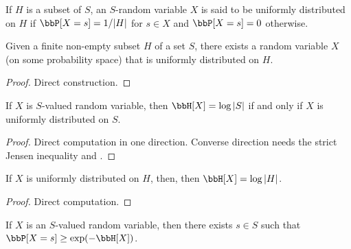 \begin{definition}\label{uniform-def}\leanok
   If $H$ is a subset of $S$, an $S$-random variable $X$ is said to be uniformly distributed on $H$ if $\bbP[X = s] = 1/|H|$ for $s \in X$ and $\bbP[X=s] = 0$ otherwise.
\end{definition}

\begin{lemma}\label{unif-exist}
  \leanok
  Given a finite non-empty subset $H$ of a set $S$, there exists a random variable $X$ (on some probability space) that is uniformly distributed on $H$.
\end{lemma}

\begin{proof}\leanok Direct construction.
\end{proof}


\begin{lemma}\label{uniform-entropy}
  \leanok
  If $X$ is $S$-valued random variable, then $\bbH[X] = \log |S|$ if and only if $X$ is uniformly distributed on $S$.
\end{lemma}

\begin{proof}
  \leanok

  Direct computation in one direction.
  Converse direction needs the strict Jensen inequality and .
\end{proof}

\begin{lemma}\label{uniform-entropy-II}
  \leanok
  If $X$ is uniformly distributed on $H$, then, then $\bbH[X] = \log |H|$.
\end{lemma}

\begin{proof}\leanok Direct computation.
\end{proof}

\begin{lemma}\label{bound-conc}
  \leanok
  If $X$ is an $S$-valued random variable, then there exists $s \in S$ such that $\bbP[X=s] \geq \exp(-\bbH[X])$.
\end{lemma}

